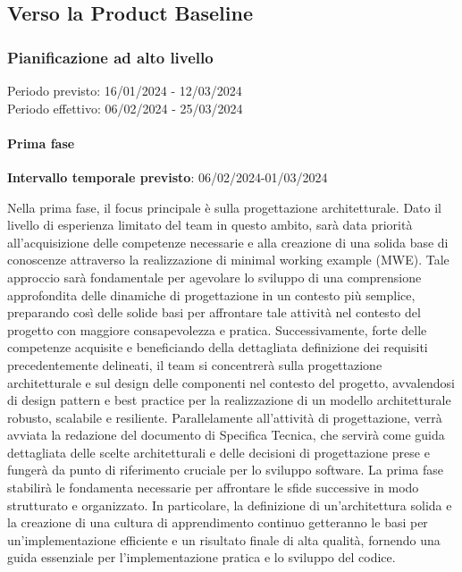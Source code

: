 \subsection{Verso la Product Baseline}

\subsubsection{Pianificazione ad alto livello}
Periodo previsto: 16/01/2024 - 12/03/2024 \\ 
\vspace{0.2cm} 
Periodo effettivo: 06/02/2024 - 25/03/2024 \\ 
\vspace{0.2cm} 


\paragraph{Prima fase}

\textbf{Intervallo temporale previsto}: 06/02/2024-01/03/2024 \\ 

\vspace{0.2cm}

Nella prima fase, il focus principale è sulla progettazione architetturale. Dato il livello di esperienza limitato del team in questo ambito, sarà data priorità all'acquisizione delle competenze necessarie e alla creazione di una solida base di conoscenze attraverso la realizzazione di minimal working example (MWE). Tale approccio sarà fondamentale per agevolare lo sviluppo di una comprensione approfondita delle dinamiche di progettazione in un contesto più semplice, preparando così delle solide basi per affrontare tale attività nel contesto del progetto con maggiore consapevolezza e pratica.
Successivamente, forte delle competenze acquisite e beneficiando della dettagliata definizione dei requisiti precedentemente delineati, il team si concentrerà sulla progettazione architetturale e sul design delle componenti nel contesto del progetto, avvalendosi di design pattern e best practice per la realizzazione di un modello architetturale robusto, scalabile e resiliente.
Parallelamente all’attività di progettazione, verrà avviata la redazione del documento di Specifica Tecnica, che servirà come guida dettagliata delle scelte architetturali e delle decisioni di progettazione prese e fungerà da punto di riferimento cruciale per lo sviluppo software.
La prima fase stabilirà le fondamenta necessarie per affrontare le sfide successive in modo strutturato e organizzato. In particolare, la definizione di un'architettura solida e la creazione di una cultura di apprendimento continuo getteranno le basi per un'implementazione efficiente e un risultato finale di alta qualità, fornendo una guida essenziale per l'implementazione pratica e lo sviluppo del codice.

